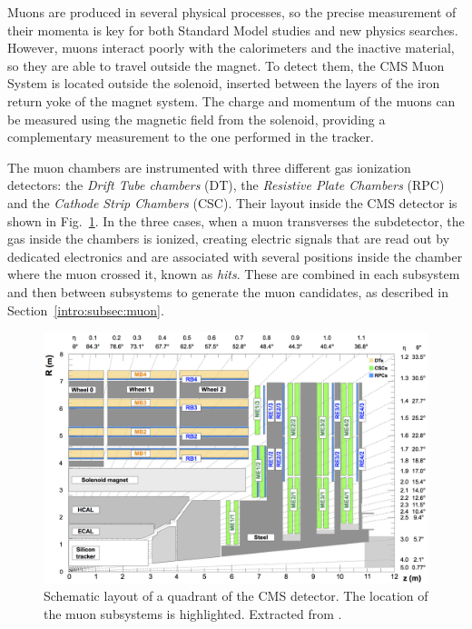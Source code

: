 \documentclass[../main.tex]{subfiles}
\begin{document}
Muons are produced in several physical processes, so the precise measurement of their momenta is key for both Standard Model studies and new physics searches. However, muons interact poorly with the calorimeters and the inactive material, so they are able to travel outside the magnet. To detect them, the CMS Muon System \cite{intro:exp:cms, intro:exp:muon} is located outside the solenoid, inserted between the layers of the iron return yoke of the magnet system. The charge and momentum of the muons can be measured using the magnetic field from the solenoid, providing a complementary measurement to the one performed in the tracker.

The muon chambers are instrumented with three different gas ionization detectors: the \textit{Drift Tube chambers} (DT), the \textit{Resistive Plate Chambers} (RPC) and the \textit{Cathode Strip Chambers} (CSC). Their layout inside the CMS detector is shown in Fig.~\ref{intro:fig:muon}. In the three cases, when a muon transverses the subdetector, the gas inside the chambers is ionized, creating electric signals that are read out by dedicated electronics and are associated with several positions inside the chamber where the muon crossed it, known as \textit{hits}. These are combined in each subsystem and then between subsystems to generate the muon candidates, as described in Section~\ref{intro:subsec:muon}.

\begin{figure}
\begin{center}
\includegraphics[width=\textwidth]{Images/muonsystem}
\end{center}
\caption[CMS muon detector structure]{Schematic layout of a quadrant of the CMS detector. The location of the muon subsystems is highlighted. Extracted from \cite{intro:id:muon_13tev}.}
\label{intro:fig:muon}
\end{figure}
\end{document}
